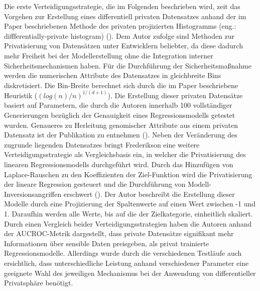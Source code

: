 Die erste Verteidigungsstrategie, die im Folgenden beschrieben wird, zeit das Vorgehen zur Erstellung eines differentiell privaten Datensatzes anhand der im Paper beschriebenen \glqq Methode des privaten projizierten Histogramms\grqq{} (eng.: diffferentially-private histogram) (\cite[9]{fredrikson_privacy_2014}). Dem Autor zufolge sind Methoden zur Privatisierung von Datensätzen unter Entwicklern beliebter, da diese dadurch mehr Freiheit bei der Modellerstellung ohne die Integration interner Sicherheitsmechanismen haben. Für die Durchführung der Sicherheitsmaßnahme werden die numerischen Attribute des Datensatzes in gleichbreite Bins diskretisiert. Die Bin-Breite berechnet sich durch die im Paper beschriebene Heuristik ($(log(n)/n)^{1/(d+1)}$). Die Erstellung dieser privaten Datensätze basiert auf Parametern, die durch die Autoren innerhalb 100 vollständiger Generierungen bezüglich der Genauigkeit eines Regressionsmodells getestet wurden. Genaueres zu Herleitung genomischer Attribute aus einem privaten Datensatz ist der Publikation zu entnehmen (\cite[9]{fredrikson_privacy_2014}). Neben der Veränderung des zugrunde liegenden Datensatzes bringt Frederikson eine weitere Verteidigungsstrategie als Vergleichsbasis ein, in welcher die Privatisierung des linearen Regressionsmodells durchgeführt wird. Durch das Hinzufügen von Laplace-Rauschen zu den Koeffizienten der Ziel-Funktion wird die Privatisierung der lineare Regression gesteuert und die Durchführung von Modell-Inversionsangriffen erschwert (\cite[9]{fredrikson_privacy_2014}). Der Autor beschreibt die Erstellung dieser Modelle durch eine Projizierung der Spaltenwerte auf einen Wert zwischen -1 und 1. Daraufhin werden alle Werte, bis auf die der Zielkategorie, einheitlich skaliert. Durch einen Vergleich beider Verteidigungsstrategien haben die Autoren anhand der AUCROC-Metrik dargestellt, dass private Datensätze signifikant mehr Informationen über sensible Daten preisgeben, als privat trainierte Regressionsmodelle. Allerdings wurde durch die verschiedenen Testläufe auch ersichtlich, dass unterschiedliche Leistung anhand verschiedener Parameter eine geeignete Wahl des jeweiligen Mechanismus bei der Anwendung von differentieller Privatsphäre benötigt.

